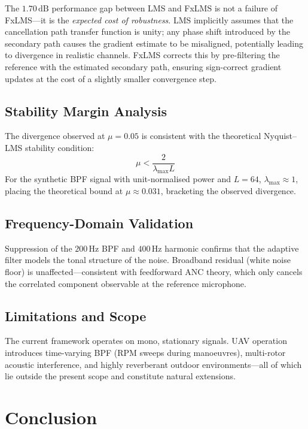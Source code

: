 \documentclass[journal,12pt,onecolumn]{IEEEtran}
\newcommand{\SI}[2]{\ensuremath{#1\,\mathrm{#2}}}
\begin{document}
The \SI{1.70}{dB} performance gap between LMS and FxLMS is not a failure
of FxLMS—it is the \emph{expected cost of robustness}.
LMS implicitly assumes that the cancellation path transfer function is
unity; any phase shift introduced by the secondary path causes the gradient
estimate to be misaligned, potentially leading to divergence in realistic
channels.
FxLMS corrects this by pre-filtering the reference with the estimated
secondary path, ensuring sign-correct gradient updates at the cost of a
slightly smaller convergence step.

\subsection{Stability Margin Analysis}

The divergence observed at $\mu=0.05$ is consistent with the theoretical
Nyquist--LMS stability condition:
\begin{equation}
  \mu < \frac{2}{\lambda_{\max} L}
\end{equation}
For the synthetic BPF signal with unit-normalised power and $L=64$,
$\lambda_{\max}\approx 1$, placing the theoretical bound at $\mu\approx
0.031$, bracketing the observed divergence.

\subsection{Frequency-Domain Validation}

Suppression of the \SI{200}{Hz} BPF and \SI{400}{Hz} harmonic confirms
that the adaptive filter models the tonal structure of the noise.
Broadband residual (white noise floor) is unaffected—consistent with
feedforward ANC theory, which only cancels the correlated component
observable at the reference microphone.

\subsection{Limitations and Scope}

The current framework operates on mono, stationary signals.
UAV operation introduces time-varying BPF (RPM sweeps during manoeuvres),
multi-rotor acoustic interference, and highly reverberant outdoor
environments—all of which lie outside the present scope and constitute
natural extensions.

\section{Conclusion}
\label{sec:conclusion}
\end{document}
